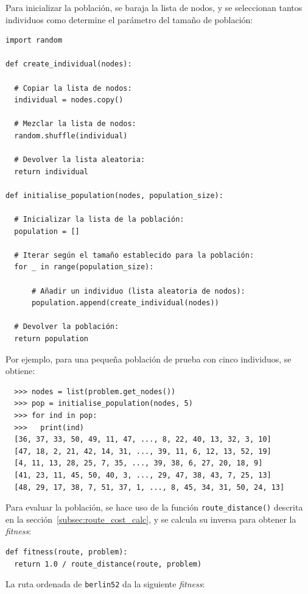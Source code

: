 Para inicializar la población, se baraja la lista de nodos, y se seleccionan tantos individuos como determine el parámetro
del tamaño de población:
\newline
\begin{lstlisting}[style=PythonStyle]
import random

def create_individual(nodes):

  # Copiar la lista de nodos:
  individual = nodes.copy()

  # Mezclar la lista de nodos:
  random.shuffle(individual)

  # Devolver la lista aleatoria:
  return individual

def initialise_population(nodes, population_size):

  # Inicializar la lista de la población:
  population = []

  # Iterar según el tamaño establecido para la población:
  for _ in range(population_size):

      # Añadir un individuo (lista aleatoria de nodos):
      population.append(create_individual(nodes))

  # Devolver la población:
  return population
\end{lstlisting}

Por ejemplo, para una pequeña población de prueba con cinco individuos, se obtiene:

\begin{verbatim}
  >>> nodes = list(problem.get_nodes())
  >>> pop = initialise_population(nodes, 5)
  >>> for ind in pop:
  >>>   print(ind)
  [36, 37, 33, 50, 49, 11, 47, ..., 8, 22, 40, 13, 32, 3, 10]
  [47, 18, 2, 21, 42, 14, 31, ..., 39, 11, 6, 12, 13, 52, 19]
  [4, 11, 13, 28, 25, 7, 35, ..., 39, 38, 6, 27, 20, 18, 9]
  [41, 23, 11, 45, 50, 40, 3, ..., 29, 47, 38, 43, 7, 25, 13]
  [48, 29, 17, 38, 7, 51, 37, 1, ..., 8, 45, 34, 31, 50, 24, 13]
\end{verbatim}

Para evaluar la población, se hace uso de la función \texttt{route\_distance()} descrita en la 
sección~\ref{subsec:route_cost_calc}, y se calcula su inversa para obtener la \textit{fitness}:
\newline
\begin{lstlisting}[style=PythonStyle]
def fitness(route, problem):
  return 1.0 / route_distance(route, problem)
\end{lstlisting}

La ruta ordenada de \texttt{berlin52} da la siguiente \textit{fitness}:


